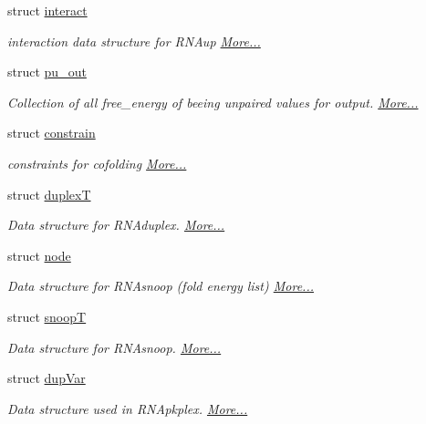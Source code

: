 \begin{DoxyCompactItemize}
struct \hyperlink{group__data__structures_structinteract}{interact}
\begin{DoxyCompactList}\small\item\em interaction data structure for R\+N\+Aup  \hyperlink{group__data__structures_structinteract}{More...}\end{DoxyCompactList}\item 
struct \hyperlink{group__data__structures_structpu__out}{pu\+\_\+out}
\begin{DoxyCompactList}\small\item\em Collection of all free\+\_\+energy of beeing unpaired values for output.  \hyperlink{group__data__structures_structpu__out}{More...}\end{DoxyCompactList}\item 
struct \hyperlink{group__data__structures_structconstrain}{constrain}
\begin{DoxyCompactList}\small\item\em constraints for cofolding  \hyperlink{group__data__structures_structconstrain}{More...}\end{DoxyCompactList}\item 
struct \hyperlink{group__data__structures_structduplexT}{duplexT}
\begin{DoxyCompactList}\small\item\em Data structure for R\+N\+Aduplex.  \hyperlink{group__data__structures_structduplexT}{More...}\end{DoxyCompactList}\item 
struct \hyperlink{group__data__structures_structnode}{node}
\begin{DoxyCompactList}\small\item\em Data structure for R\+N\+Asnoop (fold energy list)  \hyperlink{group__data__structures_structnode}{More...}\end{DoxyCompactList}\item 
struct \hyperlink{group__data__structures_structsnoopT}{snoopT}
\begin{DoxyCompactList}\small\item\em Data structure for R\+N\+Asnoop.  \hyperlink{group__data__structures_structsnoopT}{More...}\end{DoxyCompactList}\item 
struct \hyperlink{group__data__structures_structdupVar}{dup\+Var}
\begin{DoxyCompactList}\small\item\em Data structure used in R\+N\+Apkplex.  \hyperlink{group__data__structures_structdupVar}{More...}\end{DoxyCompactList}\end{DoxyCompactItemize}
